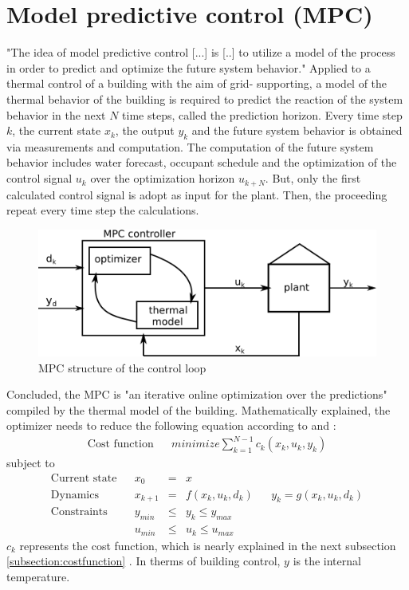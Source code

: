 \section{Model predictive control (MPC)}
\label{section:mpc}
"The idea of model predictive control [...] is [..] to utilize a model of the process in order to predict and optimize the future system behavior."
\cite{Grune.2017}
Applied to a thermal control of a building with the aim of grid- supporting, a model of the thermal behavior of the building is required to predict the reaction of the system behavior in the next $N$ time steps, called the prediction horizon. Every time step $k$, the current state \textbf{$x_k$}, the output \textbf{$y_k$} and the future system behavior is obtained via measurements and computation. The computation of the future system behavior includes water forecast, occupant schedule  and the optimization of the control signal \textbf{$u_k$} over the optimization horizon \textbf{$u_{k+N}$}. But, only the first calculated control signal is adopt as input for the plant.
Then, the proceeding repeat every time step the calculations. 
 \begin{figure}[h]
    \centering
    \includegraphics[scale=0.8]{figure/MPC beispiel2.png}
    \caption{MPC structure of the control loop}
    \label{fig:sampleMPC}
    \end{figure}
\newline
Concluded, the MPC is "an iterative online optimization over the predictions"
\cite{Grune.2017} 
compiled by the thermal model of the building. Mathematically explained, the optimizer needs to reduce the following equation according to
\cite{Kouvaritakis.2018}
and
\cite{Oldewurtel.2012}:
\begin{align}
\label{eq:costfunc}
\textrm{Cost function} && minimize \sum_{k=1}^{N-1} c_k(x_k,u_k,y_k)
\end{align}
subject to 
\begin{align*}
\textrm{Current state} && x_0 &=& x \\	
\textrm{Dynamics} && x_{k+1}&=& f(x_k,u_k,d_k)		&&	y_k = g(x_k,u_k,d_k)\\				
\textrm{Constraints} && y_{min}&\leq& y_k \leq y_{max}\\		
\textrm{} && u_{min}&\leq& u_k \leq u_{max}	
\end{align*}
$c_k$ represents the cost function, which is nearly explained in the next subsection  \ref{subsection:costfunction}
. In therms of building control, $y$ is the internal temperature.
